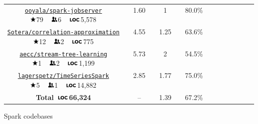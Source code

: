 \documentclass[runningheads]{llncs}
\newcommand{\myrowcolour}{\rowcolor[gray]{0.925}}
\newcommand*\loc{\includegraphics[height=0.65em,keepaspectratio]{loc}}
\newcommand*\stars{\includegraphics[height=0.8em,keepaspectratio]{stars}}
\newcommand*\contribs{\includegraphics[height=0.8em,keepaspectratio]{contribs}}
\begin{document}
\begin{sloppypar}
\begin{figure}
\begin{longtable}{c@{}c c@{}c c@{}c c@{}c c@{}c c@{}c c@{}c }
\myrowcolour%
\parbox[c][0.8cm]{4cm}{\centering\normalsize\href{https://github.com/ooyala/spark-jobserver}{\texttt{ooyala/spark-jobserver}}\\ \stars 79 ~ \contribs 6 ~ \loc 5,578} && 1.60 && 1 && 80.0\% \\

\parbox[c][0.8cm]{5cm}{\centering\normalsize\href{https://github.com/Sotera/correlation-approximation}{\texttt{Sotera/correlation-approximation}}\\ \stars 12 ~ \contribs 2 ~ \loc 775} && 4.55 && 1.25 && 63.6\% \\

\myrowcolour%
\parbox[c][0.8cm]{4cm}{\centering\normalsize\href{https://github.com/aecc/stream-tree-learning}{\texttt{aecc/stream-tree-learning}}\\ \stars 1 ~ \contribs 2 ~ \loc 1,199} && 5.73 && 2 && 54.5\% \\

\parbox[c][0.8cm]{5cm}{\centering\normalsize\href{https://github.com/lagerspetz/TimeSeriesSpark}{\texttt{lagerspetz/TimeSeriesSpark}}\\ \stars 5 ~ \contribs 1 ~ \loc 14,882} && 2.85 && 1.77 && 75.0\% \\

\bottomrule

\textbf{Total~\loc 66,324} && -- && 1.39 && 67.2\% \\

\bottomrule

\end{longtable}
\caption{Spark codebases}
\end{figure}



%





\end{sloppypar}
\end{document}
